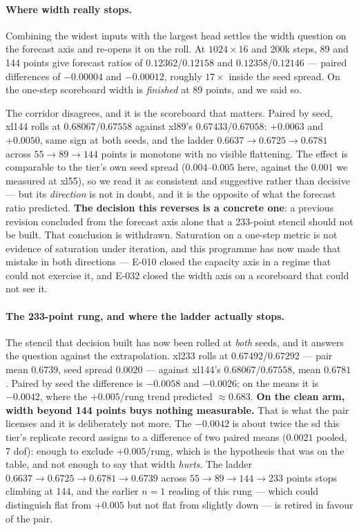 \documentclass[10pt]{article}
\begin{document}
\paragraph{Where width really stops.} Combining the widest inputs with
the largest head settles the width question on the forecast axis and
re-opens it on the roll. At $1024\times16$ and 200k steps, 89 and 144
points give forecast ratios of $0.12362$/$0.12158$ and
$0.12358$/$0.12146$ --- paired differences of $-0.00004$ and $-0.00012$,
roughly $17\times$ inside the seed spread. On the one-step scoreboard
width is \emph{finished} at 89 points, and we said so.

The corridor disagrees, and it is the scoreboard that matters. Paired by
seed, xl144 rolls at $0.68067$/$0.67558$ against xl89's
$0.67433$/$0.67058$: $+0.0063$ and $+0.0050$, same sign at both seeds,
and the ladder $0.6637 \to 0.6725 \to 0.6781$ across
$55\to89\to144$ points is monotone with no visible flattening. The
effect is comparable to the tier's own seed spread ($0.004$--$0.005$
here, against the $0.001$ we measured at xl55), so we read it as
consistent and suggestive rather than decisive --- but its
\emph{direction} is not in doubt, and it is the opposite of what the
forecast ratio predicted. \textbf{The decision this reverses is a
concrete one}: a previous revision concluded from the forecast axis
alone that a 233-point stencil should not be built. That conclusion is
withdrawn. Saturation on a one-step metric is not evidence of
saturation under iteration, and this programme has now made that
mistake in both directions --- E-010 closed the capacity axis in a
regime that could not exercise it, and E-032 closed the width axis on a
scoreboard that could not see it.

\paragraph{The 233-point rung, and where the ladder actually stops.}
The stencil that decision built has now been rolled at \emph{both}
seeds, and it answers the question against the extrapolation. xl233
rolls at $0.67492$/$0.67292$ --- pair mean $0.6739$, seed spread
$0.0020$ --- against xl144's $0.68067$/$0.67558$, mean $0.6781$.
Paired by seed the difference is $-0.0058$ and $-0.0026$; on the means
it is $-0.0042$, where the $+0.005$/rung trend predicted $\approx
0.683$. \textbf{On the clean arm, width beyond 144 points buys nothing
measurable.} That is what the pair licenses and it is deliberately not
more. The $-0.0042$ is about twice the sd this tier's replicate record
assigns to a difference of two paired means ($0.0021$ pooled, 7 dof):
enough to exclude $+0.005$/rung, which is the hypothesis that was on
the table, and not enough to say that width \emph{hurts}. The ladder
$0.6637 \to 0.6725 \to 0.6781 \to 0.6739$ across $55\to89\to144\to233$
points stops climbing at 144, and the earlier $n{=}1$ reading of this
rung --- which could distinguish flat from $+0.005$ but not flat from
slightly down --- is retired in favour of the pair.
\end{document}

